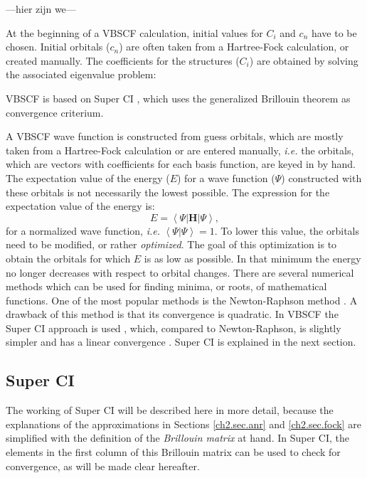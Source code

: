 ---hier zijn we---

At the beginning of a VBSCF calculation, initial values for $C_i$ and $c_n$ have to be chosen. Initial orbitals ($c_n$) are often taken from a Hartree-Fock calculation, or created manually. The coefficients for the structures ($C_i$) are obtained by solving the associated eigenvalue problem:

VBSCF is based on Super CI \cite{superci1,superci2}, which uses the generalized Brillouin theorem \cite{brillouin,genbrill} as convergence criterium.

A VBSCF wave function is constructed from guess orbitals, which are mostly taken from a Hartree-Fock calculation or are entered manually, \textit{i.e.} the orbitals, which are vectors with coefficients for each basis function, are keyed in by hand. The expectation value of the energy ($E$) for a wave function ($\Psi$) constructed with these orbitals is not necessarily the lowest possible. The expression for the expectation value of the energy is:
\begin{equation}
E = \left < \Psi | \mathbf{H} | \Psi \right >,
\label{ch2.eq.expenerg}
\end{equation}
for a normalized wave function, \textit{i.e.} $\left < \Psi | \Psi \right > = 1$. To lower this value, the orbitals need to be modified, or rather \textit{optimized}. The goal of this optimization is to obtain the orbitals for which $E$ is as low as possible. In that minimum the energy no longer decreases with respect to orbital changes. There are several numerical methods which can be used for finding minima, or roots, of mathematical functions. One of the most popular methods is the Newton-Raphson method \cite{zahid}. A drawback of this method is that its convergence is quadratic. In VBSCF the Super CI approach is used \cite{superci1,superci2}, which, compared to Newton-Raphson, is slightly simpler and has a linear convergence \cite{koos1}. Super CI is explained in the next section.

\subsection{Super CI}

The working of Super CI will be described here in more detail, because the explanations of the approximations in Sections \ref{ch2.sec.anr} and \ref{ch2.sec.fock} are simplified with the definition of the \textit{Brillouin matrix} at hand. In Super CI, the elements in the first column of this Brillouin matrix can be used to check for convergence, as will be made clear hereafter. 

